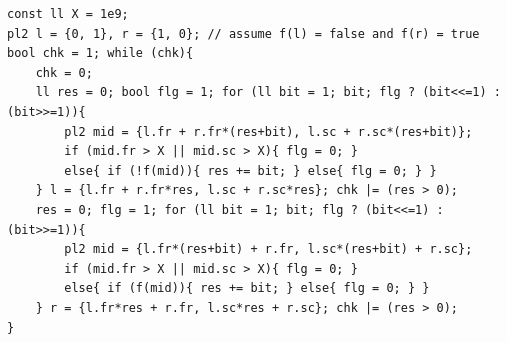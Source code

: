 \begin{verbatim}
const ll X = 1e9;
pl2 l = {0, 1}, r = {1, 0}; // assume f(l) = false and f(r) = true
bool chk = 1; while (chk){
    chk = 0;
    ll res = 0; bool flg = 1; for (ll bit = 1; bit; flg ? (bit<<=1) : (bit>>=1)){
        pl2 mid = {l.fr + r.fr*(res+bit), l.sc + r.sc*(res+bit)};
        if (mid.fr > X || mid.sc > X){ flg = 0; }
        else{ if (!f(mid)){ res += bit; } else{ flg = 0; } }
    } l = {l.fr + r.fr*res, l.sc + r.sc*res}; chk |= (res > 0);
    res = 0; flg = 1; for (ll bit = 1; bit; flg ? (bit<<=1) : (bit>>=1)){
        pl2 mid = {l.fr*(res+bit) + r.fr, l.sc*(res+bit) + r.sc};
        if (mid.fr > X || mid.sc > X){ flg = 0; }
        else{ if (f(mid)){ res += bit; } else{ flg = 0; } }
    } r = {l.fr*res + r.fr, l.sc*res + r.sc}; chk |= (res > 0);
}
\end{verbatim}